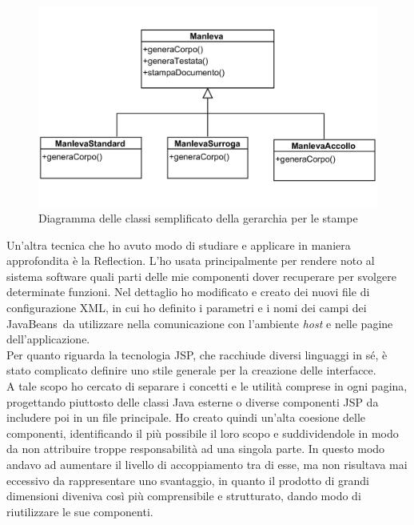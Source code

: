 	\begin{figure}[H]
		\centering
	   	\includegraphics[width=1\textwidth]{immagini/diagramma_stampe}
	   	\caption{Diagramma delle classi semplificato della gerarchia per le stampe}
	\end{figure}
	
	Un'altra tecnica che ho avuto modo di studiare e applicare in maniera approfondita è la Reflection\glossario . L'ho usata principalmente per rendere noto al sistema software quali parti delle mie componenti dover recuperare per svolgere determinate funzioni. Nel dettaglio ho modificato e creato dei nuovi file di configurazione XML, in cui ho definito i parametri e i nomi dei campi dei JavaBeans\glossario\ da utilizzare nella comunicazione con l'ambiente \textit{host} e nelle pagine dell'applicazione.\\
	
	Per quanto riguarda la tecnologia JSP, che racchiude diversi linguaggi in sé, è stato complicato definire uno stile generale per la creazione delle interfacce.\\
	
	A tale scopo ho cercato di separare i concetti e le utilità comprese in ogni pagina, progettando piuttosto delle classi Java esterne o diverse componenti JSP  da includere poi in un file principale. Ho creato quindi un'alta coesione delle componenti, identificando il più possibile il loro scopo e suddividendole in modo da non attribuire troppe responsabilità ad una singola parte. In questo modo andavo ad aumentare il livello di accoppiamento tra di esse, ma non risultava mai eccessivo da rappresentare uno svantaggio, in quanto il prodotto di grandi dimensioni diveniva così più comprensibile e strutturato, dando modo di riutilizzare le sue componenti.\\
	
